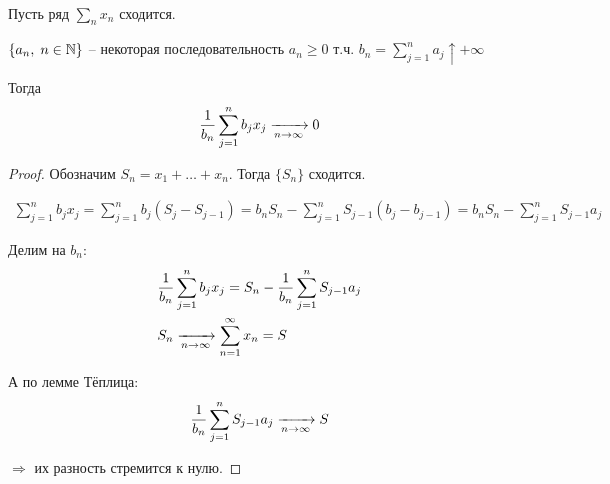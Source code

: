 \begin{lemma}[Кронекер]~

  Пусть ряд $\sum\limits_n x_n$ сходится.

  $\{a_n,\; n \in \mathbb{N}\}$ -- некоторая последовательность $a_n \geq 0$ т.ч. 
  $b_n = \sum\limits_{j = 1}^{n} a_j \uparrow +\infty$

  Тогда 
  \begin{align*}
    \frac{1}{b_n} \sum\limits_{j = 1}^{n} b_j x_j \xrightarrow[n \to \infty]{} 0
  \end{align*}

  \begin{proof}
    Обозначим $S_n = x_1 + \ldots + x_n$. Тогда $\{ S_n \}$ сходится.
    
    \begin{align*}
      \sum_{j = 1}^{n} b_j x_j = \sum_{j = 1}^{n} b_j (S_j - S_{j - 1}) 
      = b_n S_n - \sum_{j = 1}^{n} S_{j - 1} (b_j - b_{j - 1}) = 
      b_n S_n - \sum_{j = 1}^{n} S_{j - 1} a_j
    \end{align*}

    Делим на $b_n$:
    \begin{align*}
      &\frac{1}{b_n} \sum_{j = 1}^{n} b_j x_j = S_n - \frac{1}{b_n} \sum_{j = 1}^{n} S_{j - 1} a_j\\
      &S_n \xrightarrow[n \to \infty]{} \sum_{n = 1}^{\infty} x_n = S
    \end{align*}

    А по лемме Тёплица:
    \begin{align*}
      \frac{1}{b_n} \sum_{j = 1}^{n} S_{j - 1} a_j \xrightarrow[n \to \infty]{} S
    \end{align*}

    $\Rightarrow$ их разность стремится к нулю.
  \end{proof}

\end{lemma}

